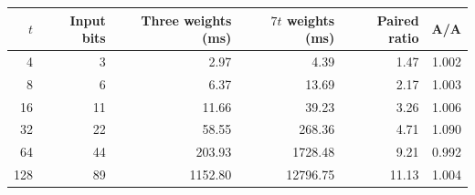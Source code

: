 \begin{tabular}{rrrrrr}
\toprule
$t$ & Input bits & Three weights (ms) & $7t$ weights (ms) & Paired ratio & A/A \\
\midrule
4 & 3 & 2.97 & 4.39 & 1.47 & 1.002 \\
8 & 6 & 6.37 & 13.69 & 2.17 & 1.003 \\
16 & 11 & 11.66 & 39.23 & 3.26 & 1.006 \\
32 & 22 & 58.55 & 268.36 & 4.71 & 1.090 \\
64 & 44 & 203.93 & 1728.48 & 9.21 & 0.992 \\
128 & 89 & 1152.80 & 12796.75 & 11.13 & 1.004 \\
\bottomrule
\end{tabular}
